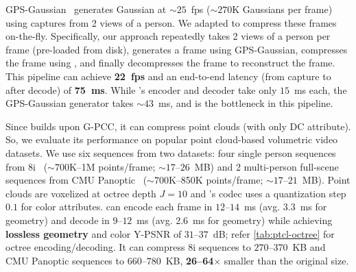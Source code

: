 %
GPS-Gaussian~\cite{zheng2024gpsgaussian} generates Gaussian at ${\sim}25$~fps (${\sim}270$K Gaussians per frame) using captures from 2 views of a person.
%
We adapted \gsnfs{} to compress these frames on-the-fly.
%
Specifically, our approach repeatedly takes 2 views of a person per frame (pre-loaded from disk), generates a \gs{} frame using GPS-Gaussian, compresses the frame using \gsnfs{}, and finally decompresses the frame to reconstruct the \gs frame.
%
This pipeline can achieve \textbf{22~fps} and an end-to-end latency (from capture to after decode) of \textbf{75~ms}.
%
While \gsnfs's encoder and decoder take only $15$~ms each, the GPS-Gaussian generator takes ${\sim}43$~ms, and is the bottleneck in this pipeline.

%
Since \gsnfs{} builds upon G-PCC, it can compress point clouds (\gs with only DC attribute).
%
So, we evaluate its performance on popular point cloud-based volumetric video datasets.
%
We use six sequences from two datasets: four single person sequences from 8i~\cite{8i-ptcl} (${\sim}700$K--1M points/frame; ${\sim}17$--$26$~MB) and 2 multi-person full-scene sequences from CMU Panoptic~\cite{panoptic} (${\sim}700$K--850K points/frame; ${\sim}17$--$21$~MB).
%
Point clouds are voxelized at octree depth $J\!=\!10$ and \gsnfs{}'s codec uses a quantization step $0.1$ for color attributes.
%
\gsnfs{} can encode each frame in $12$--$14$~ms (avg. $3.3$~ms for geometry) and decode in $9$--$12$~ms (avg. $2.6$~ms for geometry) while achieving \textbf{lossless geometry} and color Y-PSNR of $31$--$37$~dB; refer \cref{tab:ptcl-octree} for octree encoding/decoding. 
%
It can compress 8i sequences to $270$--$370$~KB and CMU Panoptic sequences to $660$--$780$~KB, \textbf{26--64$\times$} smaller than the original size.

